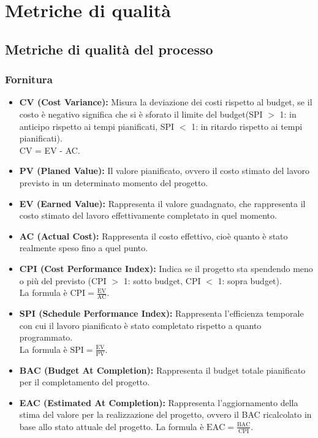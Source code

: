 \section{Metriche di qualità}
\subsection{Metriche di qualità del processo}
\subsubsection{Fornitura}
\begin{itemize}
    \item \textbf{CV (Cost Variance):} Misura la deviazione dei costi rispetto al budget, se il costo è negativo significa che si è sforato il limite del budget(SPI \( > \) 1: in anticipo rispetto ai tempi pianificati, SPI \( < \) 1: in ritardo rispetto ai tempi pianificati).
    \\CV = EV - AC.
    \item \textbf{PV (Planed Value):} Il valore pianificato, ovvero il costo stimato del lavoro previsto in un determinato momento del progetto.
    \item \textbf{EV (Earned Value):} Rappresenta il valore guadagnato, che rappresenta il costo stimato del lavoro effettivamente completato in quel momento.
    \item \textbf{AC (Actual Cost):} Rappresenta il costo effettivo, cioè quanto è stato realmente speso fino a quel punto.
    \item \textbf{CPI (Cost Performance Index):} Indica se il progetto sta spendendo meno o più del previsto (CPI \( > \) 1: sotto budget, CPI \( < \) 1: sopra budget). \\ La formula è \( \text{CPI} = \frac{\text{EV}}{\text{AC}} \).
    \item \textbf{SPI (Schedule Performance Index):} Rappresenta l'efficienza temporale con cui il lavoro pianificato è stato completato rispetto a quanto programmato.
    \\ La formula è \( \text{SPI} = \frac{\text{EV}}{\text{PV}} \).
    \item \textbf{BAC (Budget At Completion):} Rappresenta il budget totale pianificato per il completamento del progetto.
    \item \textbf{EAC (Estimated At Completion):} Rappresenta l'aggiornamento della stima del valore per la realizzazione del progetto, ovvero il BAC ricalcolato in base allo stato attuale del progetto.
    La formula è \( \text{EAC} = \frac{\text{BAC}}{\text{CPI}} \).

\end{itemize}
